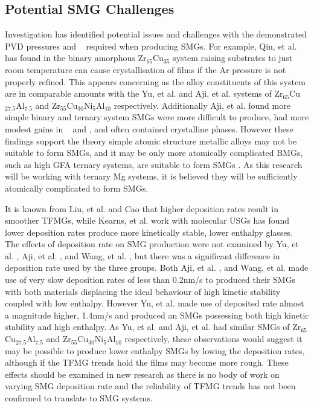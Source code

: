 \documentclass[draft,a4paper,12pt,oneside]{report}%
\begin{document}
\subsection{Potential SMG Challenges}
Investigation has identified potential issues and challenges with the demonstrated PVD pressures and \Tsub~ required when producing SMGs. For example, Qin, et al. \cite{Qin2009} has found in the binary amorphous Zr$_{65}$Cu$_{35}$ system raising substrates to just room temperature can cause crystallisation of films if the Ar pressure is not properly refined. This appears concerning as the alloy constituents of this system are in comparable amounts with the Yu, et al. \cite{Yu2013} and Aji, et al. \cite{Aji2013} systems of Zr$_{65}$Cu$_{27.5}$Al$_{7.5}$ and Zr$_{55}$Cu$_{30}$Ni$_{5}$Al$_{10}$ respectively. Additionally Aji, et al. \cite{Aji2013} found more simple binary and ternary system SMGs were more difficult to produce, had more modest gains in \Tg~ and \Tx, and often contained crystalline phases. However these findings support the theory simple atomic structure metallic alloys may not be suitable to form SMGs, and it may be only more atomically complicated BMGs, such as high GFA ternary systems, are suitable to form SMGs \cite{Yu2013}. As this research will be working with ternary Mg systems, it is believed they will be sufficiently atomically complicated to form SMGs. 

It is known from Liu, et al. \cite{Liu2012} and Cao \cite{Cao2013} that higher deposition rates result in smoother TFMGs, while Kearns, et al. \cite{Kearns2008} work with molecular USGs has found lower deposition rates produce more kinetically stable, lower enthalpy  glasses. The effects of deposition rate on SMG production were not examined by Yu, et al. \cite{Yu2013}, Aji, et al. \cite{Aji2013}, and Wang, et al. \cite{Wang2014}, but there was a significant difference in deposition rate used by the three groups. Both Aji, et al. \cite{Aji2013}, and Wang, et al. \cite{Wang2014} made use of very slow deposition rates of less than 0.2nm/s to produced their SMGs with both materials displacing the ideal behaviour of high kinetic stability coupled with low enthalpy. However Yu, et al. \cite{Yu2013} made use of deposited rate almost a magnitude higher, 1.4nm/s and produced an SMGs possessing both high kinetic stability and high enthalpy. As Yu, et al. \cite{Yu2013} and Aji, et al. \cite{Aji2013} had similar SMGs of Zr$_{65}$Cu$_{27.5}$Al$_{7.5}$ and Zr$_{55}$Cu$_{30}$Ni$_{5}$Al$_{10}$ respectively, these observations would suggest it may be possible to produce lower enthalpy SMGs by lowing the deposition rates, although if the TFMG trends hold the films may become more rough. These effects should be examined in new research as there is no body of work on varying SMG deposition rate and the reliability of TFMG trends has not been confirmed to translate to SMG systems. 
\end{document}
